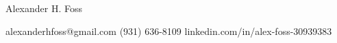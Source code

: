 \documentclass{article}
\makeatletter
\renewcommand\section{\@startsection {section}{1}{\z@}%
                                   {-2.5ex \@plus -1ex \@minus -.2ex}%
                                   {1.0ex \@plus.2ex}%
                                   {\Large\scshape\centerline}*}
\makeatother
\begin{document}
 

\thispagestyle{empty}

 
 \begin{centering}
\Large
Alexander H. Foss
\vspace{0.05in}
\normalsize

\hspace*{\fill}
alexanderhfoss@gmail.com
\hfill \textbullet
\hfill (931) 636-8109 
\hfill \textbullet
\hfill linkedin.com/in/alex-foss-30939383
\hspace*{\fill}


\end{centering}

\noindent\makebox[\linewidth]{\rule{\textwidth}{0.4pt}}

 
%
 
\end{document}
